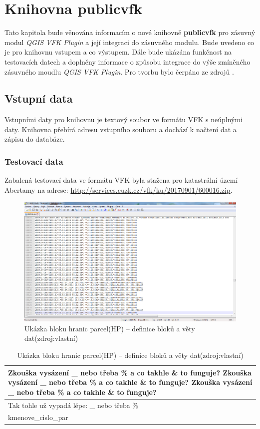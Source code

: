 \chapter{Knihovna publicvfk}
\label{4-plugin}
Tato kapitola bude věnována informacím o nové knihovně \textbf{publicvfk} pro zásuvný modul \textit{QGIS VFK Plugin} a její integraci do zásuvného modulu. Bude uvedeno co je pro knihovnu vstupem a co výstupem. Dále bude ukázána funkčnost na testovacích datech a doplněny informace o způsobu integrace do výše zmíněného zásuvného moudlu \textit{QGIS VFK Plugin}. Pro tvorbu bylo čerpáno ze zdrojů \cite{cookbook, ucebnicepython}.

\section{Vstupní data}
Vstupními daty pro knihovnu je textový soubor ve formátu VFK s neúplnými daty. Knihovna přebírá adresu vstupního souboru a dochází k načtení dat a zápisu do databáze.
\subsection{Testovací data}
Zabalená testovací data ve formátu VFK byla stažena pro katastrální území Abertamy na adrese: \href{http://services.cuzk.cz/vfk/ku/20170901/600016.zip}{http://services.cuzk.cz/vfk/ku/20170901/600016.zip}.

\begin{figure}[H]
	 \centering
      \includegraphics[width=15cm]{./pictures/testovaci_data.png}
      \caption{Ukázka bloku hranic parcel(HP) -- definice bloků a věty dat(zdroj:vlastní)}
      \label{fig:testovaci_data}
  \end{figure}
\begin{table}  
\caption{Ukázka bloku hranic parcel(HP) -- definice bloků a věty dat(zdroj:vlastní)}
\noindent\begin{tabular}{|p{\textwidth}|}
    \hline
    Zkouška vysázení \_ nebo třeba \% a co takhle \& to funguje? Zkouška vysázení \_ nebo třeba \% a co takhle \& to funguje? Zkouška vysázení \_ nebo třeba \% a co takhle \& to funguje?  \\ \hline
    Tak tohle už vypadá lépe: \_ nebo třeba \% \\ \hline
    kmenove\_cislo\_par \\ \hline
    \hline 
    \end{tabular}
\end{table}

